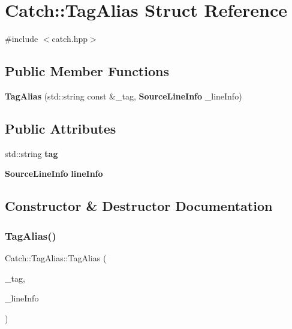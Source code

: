 \section{Catch\+:\+:Tag\+Alias Struct Reference}
\label{struct_catch_1_1_tag_alias}


{\ttfamily \#include $<$catch.\+hpp$>$}

\subsection*{Public Member Functions}
\begin{DoxyCompactItemize}
\item 
\textbf{ Tag\+Alias} (std\+::string const \&\+\_\+tag, \textbf{ Source\+Line\+Info} \+\_\+line\+Info)
\end{DoxyCompactItemize}
\subsection*{Public Attributes}
\begin{DoxyCompactItemize}
\item 
std\+::string \textbf{ tag}
\item 
\textbf{ Source\+Line\+Info} \textbf{ line\+Info}
\end{DoxyCompactItemize}


\subsection{Constructor \& Destructor Documentation}
\mbox{\label{struct_catch_1_1_tag_alias_ae5a030edfbc8e37f28310d4ca599396c}} 
\subsubsection{Tag\+Alias()}
{\footnotesize\ttfamily Catch\+::\+Tag\+Alias\+::\+Tag\+Alias (\begin{DoxyParamCaption}\item[{std\+::string const \&}]{\+\_\+tag,  }\item[{\textbf{ Source\+Line\+Info}}]{\+\_\+line\+Info }\end{DoxyParamCaption})\hspace{0.3cm}{\ttfamily [inline]}}



